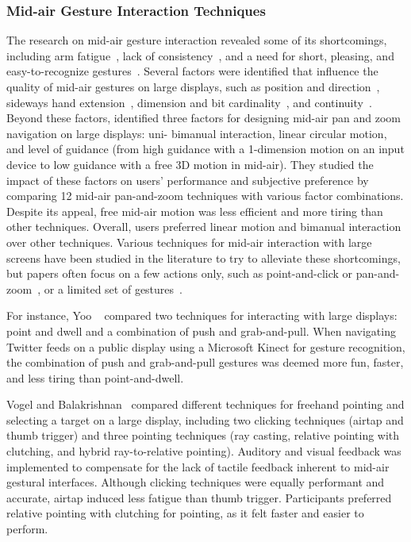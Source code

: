 \subsubsection{Mid-air Gesture Interaction Techniques}
The research on mid-air gesture interaction revealed some of its shortcomings, including arm fatigue~\cite{Gupta:2017}, lack of consistency~\cite{Groenewald:2016}, and a need for short, pleasing, and easy-to-recognize gestures~\cite{Kohlsdorf:2013}. 
%
Several factors were identified that influence the quality of mid-air gestures on large displays, such as position and direction~\cite{Fruchard:2018}, sideways hand extension~\cite{Koutsabasis:2016}, dimension and bit cardinality~\cite{Vatavu:2013}, and continuity~\cite{Kohlsdorf:2013}. Beyond these factors, \cite{Nancel:2011} identified three factors for designing mid-air pan and zoom navigation on large displays: uni- \vs bimanual interaction, linear \vs circular motion, and level of guidance (from high guidance with a 1-dimension motion on an input device to low guidance with a free 3D motion in mid-air). They studied the impact of these factors on users' performance and subjective preference by comparing 12 mid-air pan-and-zoom techniques with various factor combinations. Despite its appeal, free mid-air motion was less efficient and more tiring than other techniques. Overall, users preferred linear motion and bimanual interaction over other techniques.
%
Various techniques for mid-air interaction with large screens have been studied in the literature to try to alleviate these shortcomings, but papers often focus on a few actions only, such as point-and-click or pan-and-zoom~\cite{Nacenta:2013}, or a limited set of gestures~\cite{Groenewald:2016}.

For instance, Yoo \etal~\cite{Yoo:2015} compared two techniques for interacting with large displays: point and dwell and a combination of push and grab-and-pull. When navigating Twitter feeds on a public display using a Microsoft Kinect for gesture recognition, the combination of push and grab-and-pull gestures was deemed more fun, faster, and less tiring than point-and-dwell.

Vogel and Balakrishnan~\cite{Vogel:2005} compared different techniques for freehand pointing and selecting a target on a large display, including two clicking techniques (airtap and thumb trigger) and three pointing techniques (ray casting, relative pointing with clutching, and hybrid ray-to-relative pointing). Auditory and visual feedback was implemented to compensate for the lack of tactile feedback inherent to mid-air gestural interfaces. Although clicking techniques were equally performant and accurate, airtap induced less fatigue than thumb trigger. Participants preferred relative pointing with clutching for pointing, as it felt faster and easier to perform.


